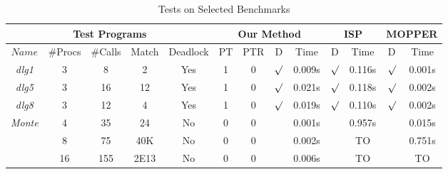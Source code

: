 \begin{savenotes}
\begin{table*}[t]
\begin{center}
\small
\caption{Tests on Selected Benchmarks}\label{table:benchmarks}
     \begin{threeparttable}
\begin{tabular}{|c|c|c|c|c|c|c|c|c|c|c|c|c|}
		\hline
         \multicolumn{5}{|c|}{Test Programs} & \multicolumn{4}{c|}{Our Method} & \multicolumn{2}{c|}{ISP} & \multicolumn{2}{c|}{MOPPER}  \\ \hline
          $Name$ & \#Procs & \#Calls&Match&Deadlock &PT & PTR &D & Time & D &Time & D & Time\\ \hline
           \textit{dlg1} & 3 & 8 & 2  & Yes & 1& 0&$\surd$ & 0.009s & $\surd$ & 0.116s & $\surd$  & 0.001s\\ \hline
          \hline
           \textit{dlg5} & 3 & 16 & 12  & Yes &1&0 & $\surd$ & 0.021s & $\surd$ & 0.118s & $\surd$ & 0.002s\\ \hline
          \hline
           \textit{dlg8} & 3 & 12 & 4 & Yes &1& 0& $\surd$ & 0.019s & $\surd$ & 0.110s & $\surd$ & 0.002s\\ \hline
          \hline
          
          
          \multirow{3}{*}{\textit{Monte}} & 4 & 35 &  24 
          						         & No  &0 &0 &  & 0.001s &  & 0.957s &  & 0.015s\\ \cline{2-13}
						       		& 8 & 75 &  40K 
          						        & No  &0&0 &  & 0.002s &  & TO &  & 0.751s\\ \cline{2-13}
						              & 16 & 155 &  2E13 
          						        & No  &0& 0& & 0.006s &  & TO &  & TO\\ \hline
						       \hline
						       

\end{tabular}
\end{threeparttable}
\end{center}
\end{table*}
\end{savenotes}
